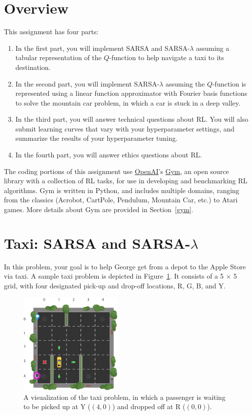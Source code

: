\documentclass{article}
\begin{document}
\section{Overview}
This assignment has four parts:

\begin{enumerate}
    \item In the first part, you will implement SARSA and
      SARSA-$\lambda$ assuming a tabular representation of the
      $Q$-function to help navigate a taxi to its destination.
      
    \item In the second part, you will implement SARSA-$\lambda$
      assuming the $Q$-function is represented using a linear function
      approximator with Fourier basis functions to solve the mountain
      car problem, in which a car is stuck in a deep valley.
      
    \item In the third part, you will answer technical questions about
      RL.  You will also submit learning curves that vary with your
      hyperparameter settings, and summarize the results of your
      hyperparameter tuning.

    \item In the fourth part, you will answer ethics questions about RL.
\end{enumerate}

The coding portions of this assignment use
\href{https://openai.com/}{OpenAI}'s
\href{https://gym.openai.com/}{Gym}, an open source library with a
collection of RL tasks, for use in developing and benchmarking RL
algorithms.  Gym is written in Python, and includes multiple domains,
ranging from the classics (Acrobot, CartPole, Pendulum, Mountain Car,
etc.) to Atari games.  More details about Gym are provided in
Section~\ref{gym}.


\section{Taxi: SARSA and SARSA-$\lambda$}
In this problem, your goal is to help George get from a depot to the
Apple Store via taxi.  A sample taxi problem is depicted in
Figure~\ref{fig:taxi}.  It consists of a 5 $\times$ 5 grid, with four
designated pick-up and drop-off locations, R, G, B, and Y.

\begin{figure}[ht!]
  \centering
    \includegraphics[width=2in]{taxi.png}
    \caption{A visualization of the taxi problem, in which a passenger is
      waiting to be picked up at Y ($(4,0)$) and dropped off at R ($(0,0)$).}
    \label{fig:taxi}
\end{figure}
\end{document}
